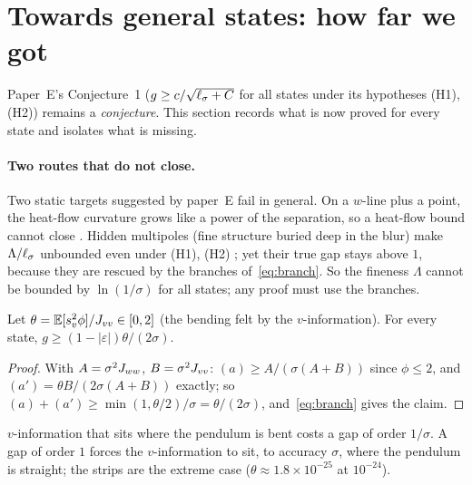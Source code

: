 \section{Towards general states: how far we got}
\label{sec:general}

Paper~E's Conjecture~1 ($g\ge c/\sqrt{\ell_\sigma+C}$ for all states under its hypotheses (H1), (H2)) remains a \emph{conjecture}. This section records
what is now proved for every state and isolates what is missing.

\paragraph*{Two routes that do not close.}
Two static targets suggested by paper~E fail in general. On a $w$-line plus a point, the heat-flow curvature grows like a power of the
separation, so a heat-flow bound cannot close \proofst. Hidden multipoles (fine structure buried deep in the blur) make $\Lambda/\ell_\sigma$ unbounded
even under (H1), (H2) \derivst{}\numst; yet their true gap stays above $1$, because they are rescued by the branches of~\eqref{eq:branch}.
So the fineness $\Lambda$ cannot be bounded by $\ln(1/\sigma)$ for all states; any proof must use the branches.

\begin{lemma} \proofst
\label{lem:BB1}
Let $\theta=\mathbb{E}[s_v^2\phi]/J_{vv}\in[0,2]$ (the bending felt by the $v$-information). For every state, $g\ge(1-|\varepsilon|)\theta/(2\sigma)$.
\end{lemma}
\begin{proof}
With $A=\sigma^2J_{ww}$, $B=\sigma^2J_{vv}$: $(a)\ge A/(\sigma(A+B))$ since $\phi\le2$, and $(a')=\theta B/(2\sigma(A+B))$ exactly; so
$(a)+(a')\ge\min(1,\theta/2)/\sigma=\theta/(2\sigma)$, and~\eqref{eq:branch} gives the claim.
\end{proof}

$v$-information that sits where the pendulum is bent costs a gap of order $1/\sigma$. A gap of order $1$ forces the $v$-information to sit,
to accuracy $\sigma$, where the pendulum is straight; the strips are the extreme case ($\theta\approx1.8\times10^{-25}$ at $10^{-24}$).

